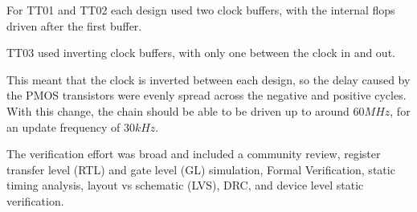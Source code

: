 For TT01 and TT02 each design used two clock buffers, with the internal flops driven after the first buffer.

TT03 used inverting clock buffers, with only one between the clock in and out.

This meant that the clock is inverted between each design, so the delay caused by the PMOS transistors were evenly spread across the negative and positive cycles.
With this change, the chain should be able to be driven up to around \(60 MHz\), for an update frequency of \(30 kHz\).

The verification effort\cite{verificationmd} was broad and included a community review, register transfer level (RTL) and gate level (GL) simulation, Formal Verification\cite{sby}, static timing analysis, layout vs schematic (LVS), DRC, and device level static verification\cite{cvc}.
